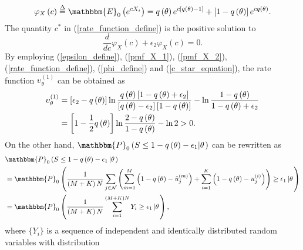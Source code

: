\documentclass[11pt, draftclsnofoot, onecolumn]{IEEEtran}
\newcommand{\bbE}{\mathbbm{E}}
\newcommand{\bbP}{\mathbbm{P}}
\newcommand{\cu}{{\check{u}}}
\begin{document}
\begin{IEEEproof}
\begin{equation}
{\varphi _X}\left( c \right) \buildrel \Delta \over = {\bbE_0}\left( {{e^{c{X_i}}}} \right) = q\left( \theta  \right){e^{c\left[ {q\left( \theta  \right) - 1} \right]}} + \left[1- {q\left( \theta  \right) } \right]{e^{cq\left( \theta  \right)}}.
\end{equation}
The quantity $c^*$ in (\ref{rate_function_define}) is the positive solution   to  
\begin{equation} \label{c_star_equation}
\frac{d}{{dc}}{\varphi _X}\left( c \right) + {\epsilon _2}{\varphi _X}\left( c \right) = 0.
\end{equation}
By employing (\ref{epsilon_define}), (\ref{pmf_X_1}), (\ref{pmf_X_2}), (\ref{rate_function_define}), (\ref{phi_define}) and (\ref{c_star_equation}), the rate function  $\upsilon _\theta ^{\left( 1 \right)}$ can be obtained as
\begin{align} \notag
\upsilon _\theta ^{\left( 1 \right)} & = \left[ {{\epsilon _2} - q\left( \theta  \right)} \right]\ln \frac{{q\left( \theta  \right)\left[ {1 - q\left( \theta  \right) + {\epsilon _2}} \right]}}{{\left[ {q\left( \theta  \right) - {\epsilon _2}} \right]\left[ {1 - q\left( \theta  \right)} \right]}} - \ln \frac{{1 - q\left( \theta  \right)}}{{1 - q\left( \theta  \right) + {\epsilon _2}}}\\
&  = \left[ {1 - \frac{1}{2}q\left( \theta  \right)} \right]\ln \frac{{2 - q\left( \theta  \right)}}{{1 - q\left( \theta  \right)}} - \ln 2 >0.
\end{align}
On the other hand, ${\bbP_0}\left( {S \le 1 - q\left( \theta  \right) - {\epsilon_1}} {\left| \theta  \right.} \right)$ can be rewritten as
\begin{align} \notag
& {\bbP_0}\left( {S \le 1 - q\left( \theta  \right) - {\epsilon _1}\left| \theta  \right.} \right) \\ \notag
& = {\bbP_0}\left( {\frac{1}{{\left( {M + K} \right)N}}\sum\limits_{j \in {\cal N}} {\left( {\sum\limits_{m = 1}^M {\left( {1 - q\left( \theta  \right) - \cu_j^{(m)}} \right)}  + \sum\limits_{i = 1}^K {\left( {1 - q\left( \theta  \right) - u_j^{(i)}} \right)} } \right)}  \ge {\epsilon _1}\left| \theta  \right.} \right)\\
& = {\bbP_0}\left( {\frac{1}{{\left( {M + K} \right)N}}\sum\limits_{i = 1}^{\left( {M + K} \right)N} {{Y_i}}  \ge {\epsilon _1}\left| \theta  \right.} \right),
\end{align}
where $\{Y_i\}$ is a sequence of independent and identically distributed random variables with distribution
\begin{equation} \label{pmf_Y_1}

\end{equation}
\end{IEEEproof}
\end{document}
